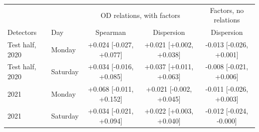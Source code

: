 \begin{tabular}{@{}llccc@{}}\toprule
 & & \multicolumn{2}{c}{OD relations, with factors} & Factors, no relations \\
Detectors & Day & Spearman & Dispersion & Dispersion \\\midrule
Test half, 2020 & Monday & +0.024 [-0.027, +0.077] & +0.021 [+0.002, +0.038] & -0.013 [-0.026, +0.001] \\
Test half, 2020 & Saturday & +0.034 [-0.016, +0.085] & +0.037 [+0.011, +0.063] & -0.008 [-0.021, +0.006] \\
2021 & Monday & +0.068 [-0.011, +0.152] & +0.021 [-0.002, +0.045] & -0.011 [-0.026, +0.003] \\
2021 & Saturday & +0.034 [-0.021, +0.094] & +0.022 [+0.003, +0.040] & -0.012 [-0.024, -0.000] \\
\bottomrule\end{tabular}
